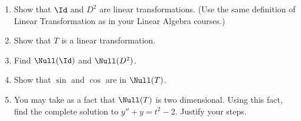 \begin{enumerate}
	\begin{enumerate}
		\item Show that $\Id$ and $D^2$ are linear transformations. (Use the same definition of Linear Transformation as in your Linear Algebra courses.)
		\item Show that $T$ is a linear transformation.
		\item Find $\Null(\Id)$ and $\Null(D^2)$.
		\item Show that $\sin$ and $\cos$ are in $\Null(T)$.
		\item You may take as a fact that $\Null(T)$ is two dimensional. Using this fact, find the complete solution to $y''+y=t^2-2$. Justify your steps.
	\end{enumerate}

\end{enumerate}

















